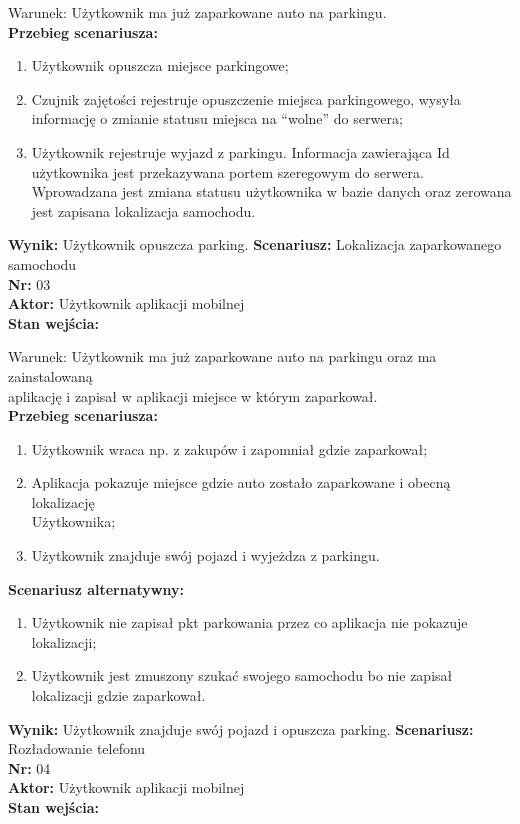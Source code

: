 \documentclass[12pt,a4paper]{article}
\begin{document}
Warunek: Użytkownik ma już zaparkowane auto na parkingu.
\\{\bf Przebieg scenariusza:}
\begin{enumerate}
\item Użytkownik opuszcza miejsce parkingowe;
\item Czujnik zajętości rejestruje opuszczenie miejsca parkingowego, wysyła informację o zmianie statusu miejsca na “wolne” do serwera;
\item Użytkownik rejestruje wyjazd z parkingu. Informacja zawierająca Id użytkownika jest przekazywana portem szeregowym do serwera. Wprowadzana jest zmiana statusu użytkownika w bazie danych oraz zerowana jest zapisana lokalizacja samochodu.
\end{enumerate}
{\bf Wynik:} Użytkownik opuszcza parking.
\newline\newline
{\large \bf Scenariusz:} Lokalizacja zaparkowanego samochodu
\\{\bf Nr:} 03
\\{\bf Aktor:} Użytkownik aplikacji mobilnej
\\{\bf Stan wejścia:}

Warunek: Użytkownik ma już zaparkowane auto na parkingu oraz ma zainstalowaną \\aplikację i zapisał w aplikacji miejsce w którym zaparkował.
\\{\bf Przebieg scenariusza:}
\begin{enumerate}
\item Użytkownik wraca np. z zakupów i zapomniał gdzie zaparkował;
\item Aplikacja pokazuje miejsce gdzie auto zostało zaparkowane i obecną lokalizację\\Użytkownika;
\item Użytkownik znajduje swój pojazd i wyjeżdza z parkingu.
\end{enumerate}
{\bf Scenariusz alternatywny:}
\begin{enumerate}
\item Użytkownik nie zapisał pkt parkowania przez co aplikacja nie pokazuje lokalizacji;
\item Użytkownik jest zmuszony szukać swojego samochodu  bo nie zapisał lokalizacji gdzie zaparkował.
\end{enumerate}
{\bf Wynik:} Użytkownik znajduje swój pojazd i opuszcza parking.
\newline\newline\newline\newline\newline\newline\newline\newline\newline
{\large \bf Scenariusz:} Rozładowanie telefonu
\\{\bf Nr:} 04
\\{\bf Aktor:} Użytkownik aplikacji mobilnej
\\{\bf Stan wejścia:}
\end{document}
